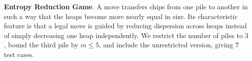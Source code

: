 \documentclass[review]{elsarticle}
\newcommand{\set}[1]{\{ #1 \}}
\newcommand{\tuple}[1]{\langle {#1} \rangle}
\newcommand{\true}{\top}
\newcommand{\statevar}{\mathcal{X}}
\newcommand{\act}{\mathcal{A}}
\newcommand{\constraint}{\mathcal{C}}
\newcommand{\estate}{\mathcal{E}}
\newcommand{\pre}{\mathtt{pre}}
\newcommand{\eff}{\mathtt{eff}}
\begin{document}
{\color{red}\textbf{Entropy Reduction Game}. A move transfers chips from one pile to another in such a way that the heaps become more nearly equal in size.}
{\color{red}Its characteristic feature is that a legal move is guided by reducing dispersion across heaps instead of simply decreasing one heap independently.}
{\color{red}We restrict the number of piles to $3$, bound the third pile by $m \le 5$, and include the unrestricted version, giving $7$ test cases.}
\end{document}
